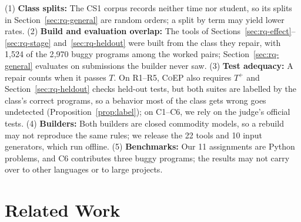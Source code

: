 \documentclass[acmsmall,screen,review,anonymous,nonacm]{acmart}
\newcommand{\tool}{\textsc{CoEP}\xspace}
\begin{document}
(1) \textbf{Class splits:} The CS1 corpus records neither time nor student, so its splits in Section~\ref{sec:rq-general} are random orders; a split by term may yield lower rates. (2) \textbf{Build and evaluation overlap:} The tools of Sections~\ref{sec:rq-effect}--\ref{sec:rq-stage} and~\ref{sec:rq-heldout} were built from the class they repair, with 1{,}524 of the 2{,}970 buggy programs among the worked pairs; Section~\ref{sec:rq-general} evaluates on submissions the builder never saw. (3) \textbf{Test adequacy:} A repair counts when it passes $T$. On R1--R5, \tool also requires $T^{+}$ and Section~\ref{sec:rq-heldout} checks held-out tests, but both suites are labelled by the class's correct programs, so a behavior most of the class gets wrong goes undetected (Proposition~\ref{prop:label}); on C1--C6, we rely on the judge's official tests. (4) \textbf{Builders:} Both builders are closed commodity models, so a rebuild may not reproduce the same rules; we release the 22 tools and 10 input generators, which run offline. (5) \textbf{Benchmarks:} Our 11 assignments are Python problems, and C6 contributes three buggy programs; the results may not carry over to other languages or to large projects.

\section{Related Work}
\label{sec:related}
\end{document}
